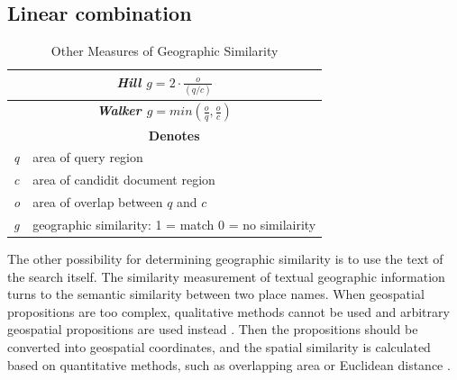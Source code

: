 \documentclass[10pt, conference, compsocconf]{IEEEtran}
\begin{document}
\subsection{Linear combination}
\begin{table}[h!]
\centering
\caption{Other Measures of Geographic Similarity}
\label{tab:simg}
\begin{tabular}{|l|l|}
\hline
\multicolumn{2}{|c|}{
\textit{
\textbf{
Hill \cite{Hill:1990vu} \(g=2\cdot\frac{o}{(q/c)}\)
}}} \\ 
\hline
\multicolumn{2}{|c|}{
\textit{
\textbf{
Walker \cite{Walker:2007hr} \(g=min(\frac{o}{q},\frac{o}{c})\)
}}} \\ 
\hline
\rowcolor[HTML]{E1E1E1} 
\multicolumn{1}{|c|}{\cellcolor[HTML]{E1E1E1}\textbf{Variable}} & \multicolumn{1}{c|}{\cellcolor[HTML]{E1E1E1}\textbf{Denotes}} \\ 
\hline
\textit{q} & area of query region \\ 
\hline
\textit{c} & area of candidit document region \\ 
\hline
\textit{o} & area of overlap between \(q\) and \(c\)\\ 
\hline
\textit{g} & geographic similarity: 1 = match 0 = no similairity \\ 
\hline
\end{tabular}

\end{table}
The other possibility for determining geographic similarity is to use the text of the search itself.  
The similarity measurement of textual geographic information turns to the semantic similarity between two place names. When geospatial propositions are too complex, qualitative methods cannot be used and arbitrary geospatial propositions are used instead \cite{Larson:1996wq}. Then the propositions should be converted into geospatial coordinates, and the spatial similarity is calculated based on quantitative methods, such as overlapping area or Euclidean distance \cite{Jones:2008isa}. 
\end{document}
